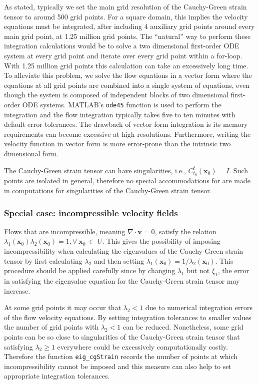 \documentclass{article}
\begin{document}
As stated, typically we set the main grid resolution of the Cauchy-Green strain tensor to around 500 grid points. For a square domain, this implies the velocity equations must be integrated, after including 4 auxiliary grid points around every main grid point, at 1.25 million grid points. The ``natural'' way to perform these integration calculations would be to solve a two dimensional first-order ODE system at every grid point and iterate over every grid point within a for-loop. With 1.25 million grid points this calculation can take an excessively long time. To alleviate this problem, we solve the flow equations in a vector form where the equations at all grid points are combined into a single system of equations, even though the system is composed of independent blocks of two dimensional first-order ODE systems. MATLAB's \lstinline!ode45! function is used to perform the integration and the flow integration typically takes five to ten minutes with default error tolerances. The drawback of vector form integration is its memory requirements can become excessive at high resolutions. Furthermore, writing the velocity function in vector form is more error-prone than the intrinsic two dimensional form.

The Cauchy-Green strain tensor can have singularities, i.e., $C_{t_0}^t(\boldsymbol x_0) = I$. Such points are isolated in general\parencite{delmarcelle94}, therefore no special accommodations for are made in computations for singularities of the Cauchy-Green strain tensor.

\subsubsection{Special case: incompressible velocity fields}

Flows that are incompressible, meaning $\nabla \cdot \boldsymbol v = 0$, satisfy the relation $\lambda_1(\boldsymbol x_0) \lambda_2(\boldsymbol x_0) = 1, \forall \: \boldsymbol x_0 \: \in \: U$\parencite{arnold78:_mathem}. This gives the possibility of imposing incompressibility when calculating the eigenvalues of the Cauchy-Green strain tensor by first calculating $\lambda_2$ and then setting $\lambda_1(\boldsymbol x_0) = 1/\lambda_2(\boldsymbol x_0)$. This procedure should be applied carefully since by changing $\lambda_1$ but not $\xi_1$, the error in satisfying the eigenvalue equation for the Cauchy-Green strain tensor may increase.

At some grid points it may occur that $\lambda_2 < 1$ due to numerical integration errors of the flow velocity equations. By setting integration tolerances to smaller values the number of grid points with $\lambda_2 < 1$ can be reduced. Nonetheless, some grid points can be so close to singularities of the Cauchy-Green strain tensor that satisfying $\lambda_2 \geq 1$ everywhere could be excessively computationally costly. Therefore the function \lstinline!eig_cgStrain! records the number of points at which incompressibility cannot be imposed and this measure can also help to set appropriate integration tolerances.
\end{document}

